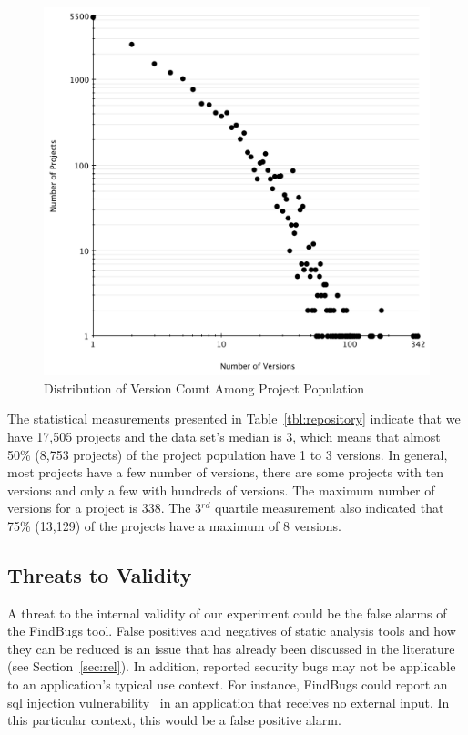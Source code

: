 \documentclass[conference]{llncs}
\begin{document}
\begin{figure}[t]
	\centering
	\includegraphics[scale=0.4]{version_count.pdf}
	\caption{Distribution of
Version Count Among Project Population}
	\label{fig:version-count}
\end{figure}

The statistical measurements presented in Table~\ref{tbl:repository}
indicate that we have 17,505 projects and the data set's median is 3,
which means that almost 50\% (8,753 projects) of the project
population have 1 to 3 versions. In general, most projects have a few
number of versions, there are some projects with ten versions and
only a few with hundreds of versions. The maximum number of versions
for a project is 338. The 3$^{rd}$ quartile measurement also indicated
that 75\% (13,129) of the projects have a maximum of 8 versions.

\subsection{Threats to Validity}
\label{sec:threats}

A threat to the internal validity of our experiment could be the false alarms of the
FindBugs tool. False positives and negatives of static analysis tools and
how they can be reduced is an issue that has already been discussed in the literature
(see Section~\ref{sec:rel}).
In addition, reported security bugs may not be applicable to an
application's typical use context.
For instance, FindBugs could report an {\sc sql} injection vulnerability~\cite{RL12}
in an application that receives no external input.
In this particular context, this would be a false positive alarm.
\end{document}
